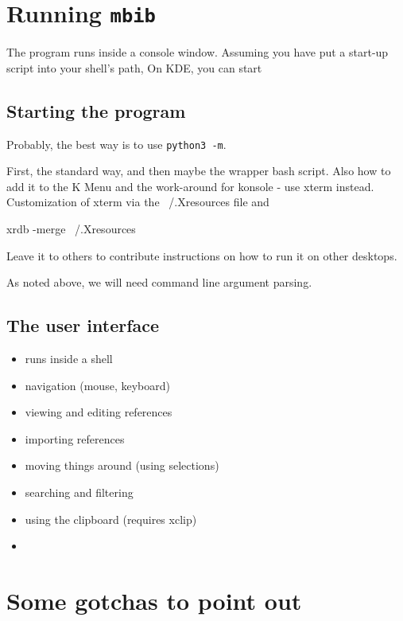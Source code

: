 \documentclass[10pt]{article}
\newcommand{\mbib}{\texttt{mbib}\xspace}
\begin{document}
\section{Running \mbib}

The program runs inside a console window. Assuming you have put a start-up script into your shell's path,  On KDE, you can start 

\subsection{Starting the program}

Probably, the best way is to use \texttt{python3 -m}. 

First, the standard way, and then maybe the wrapper bash script. Also how to add it to the K Menu and the work-around for konsole - use xterm instead. Customization of xterm via the ~/.Xresources file and 

xrdb -merge ~/.Xresources

Leave it to others to contribute instructions on how to run it on other desktops. 

As noted above, we will need command line argument parsing. 

\subsection{The user interface}

\begin{itemize}
\item runs inside a shell
\item navigation (mouse, keyboard)
\item viewing and editing references
\item importing references
\item moving things around (using selections)
\item searching and filtering
\item using the clipboard (requires xclip)
\item 
\end{itemize}

\section*{Some gotchas to point out}
\end{document}

